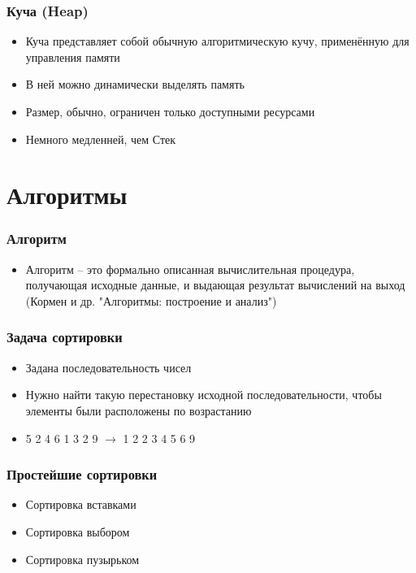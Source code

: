 \documentclass[12pt,pdf,hyperref={unicode}]{beamer}
\begin{document}
\begin{frame}[fragile]
\frametitle{Куча (Heap)} 
\begin{itemize}
\item Куча представляет собой обычную алгоритмическую кучу, применённую для управления памяти
\item В ней можно динамически выделять память
\item Размер, обычно, ограничен только доступными ресурсами
\item Немного медленней, чем Стек
\end{itemize}
\end{frame}



\section{Алгоритмы}



\begin{frame}[fragile]
\frametitle{Алгоритм} 
\begin{itemize}
\item Алгоритм -- это формально описанная вычислительная процедура, получающая исходные данные, и выдающая результат
вычислений на выход \\
(Кормен и др. "Алгоритмы: построение и анализ")
\end{itemize}
\end{frame}



\begin{frame}[fragile]
\frametitle{Задача сортировки} 
\begin{itemize}
\item Задана последовательность чисел \\
\item Нужно найти такую перестановку исходной последовательности, чтобы элементы были расположены по возрастанию  \\
\item 5 2 4 6 1 3 2 9  $\rightarrow$ 1 2 2 3 4 5 6 9
\end{itemize}
\end{frame}


\begin{frame}[fragile]
\frametitle{Простейшие сортировки} 
\begin{itemize}
\item Сортировка вставками \\
\item Сортировка выбором \\
\item Сортировка пузырьком \\
\end{itemize}
\end{frame}
\end{document}
